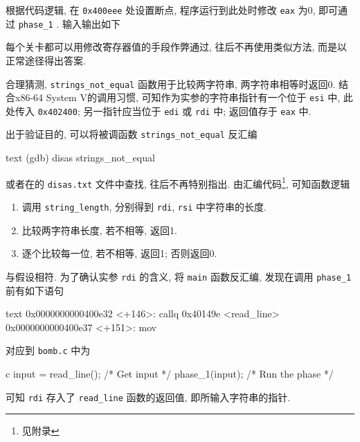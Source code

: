 根据代码逻辑, 在 \verb|0x400eee| 处设置断点, 程序运行到此处时修改 \verb|eax| 为0, 即可通过 \verb|phase_1| . 输入输出如下

每个关卡都可以用修改寄存器值的手段作弊通过, 往后不再使用类似方法, 而是以正常途径得出答案.

合理猜测, \verb|strings_not_equal| 函数用于比较两字符串, 两字符串相等时返回0. 结合x86-64 System V的调用习惯, 可知作为实参的字符串指针有一个位于 \verb|esi| 中, 此处传入 \verb|0x402400|; 另一指针应当位于 \verb|edi| 或 \verb|rdi| 中; 返回值存于 \verb|eax| 中. 

出于验证目的, 可以将被调函数 \verb|strings_not_equal| 反汇编
\begin{code}{text}
    (gdb) disas strings_not_equal
\end{code}
或者在的 \texttt{disas.txt} 文件中查找, 往后不再特别指出. 由汇编代码\footnote{见附录 }, 可知函数逻辑
\begin{enumerate}[noitemsep]
    \item 调用 \verb|string_length|, 分别得到 \verb|rdi|, \verb|rsi| 中字符串的长度.
    \item 比较两字符串长度, 若不相等, 返回1.
    \item 逐个比较每一位, 若不相等, 返回1; 否则返回0.
\end{enumerate}
与假设相符. 为了确认实参 \verb|rdi| 的含义, 将 \verb|main| 函数反汇编, 发现在调用 \verb|phase_1| 前有如下语句
\begin{code}{text}
    0x0000000000400e32 <+146>:   callq  0x40149e <read_line>
    0x0000000000400e37 <+151>:   mov    %
\end{code}
对应到 \texttt{bomb.c} 中为
\begin{code}{c}
    input = read_line();             /* Get input                   */
    phase_1(input);                  /* Run the phase               */    
\end{code}
可知 \verb|rdi| 存入了 \verb|read_line| 函数的返回值, 即所输入字符串的指针. 

